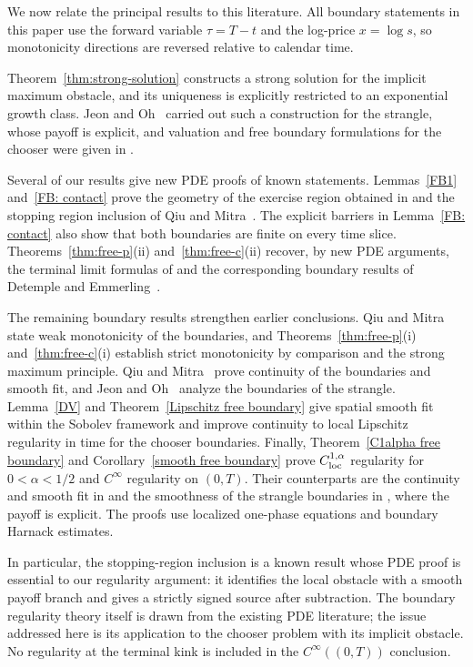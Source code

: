\documentclass[11pt, a4paper, leqno]{amsart}
\numberwithin{equation}{section}
\theoremstyle{plain}
\theoremstyle{definition}
\theoremstyle{remark}
\begin{document}
{We now relate the principal results to this literature.
All boundary statements in this paper use the forward variable
$\tau=T-t$ and the log-price $x=\log s$, so monotonicity directions are
reversed relative to calendar time.

Theorem~\ref{thm:strong-solution} constructs a strong solution for the
implicit maximum obstacle, and its uniqueness is explicitly restricted
to an exponential growth class. Jeon and Oh~\cite{JJ19} carried out such
a construction for the strangle, whose payoff is explicit, and valuation
and free boundary formulations for the chooser were given in
\cite{DETEMPLE09,Qiu2018}.

Several of our results give new PDE proofs of known statements.
Lemmas~\ref{FB1} and~\ref{FB: contact} prove the geometry of the
exercise region obtained in \cite{DETEMPLE09} and the stopping region
inclusion of Qiu and Mitra~\cite[Theorems~1 and~2]{Qiu2018}. The
explicit barriers in Lemma~\ref{FB: contact} also show that both
boundaries are finite on every time slice.
Theorems~\ref{thm:free-p}(ii) and~\ref{thm:free-c}(ii) recover, by new
PDE arguments, the terminal limit formulas of
\cite[Theorem~4]{Qiu2018} and the corresponding boundary results of
Detemple and Emmerling~\cite{DETEMPLE09}.

The remaining boundary results strengthen earlier conclusions.
Qiu and Mitra~\cite[Theorem~4]{Qiu2018} state weak monotonicity of the
boundaries, and Theorems~\ref{thm:free-p}(i) and~\ref{thm:free-c}(i)
establish strict monotonicity by comparison and the strong maximum
principle. Qiu and Mitra~\cite[Theorem~5]{Qiu2018} prove continuity of
the boundaries and smooth fit, and Jeon and Oh~\cite{JJ19} analyze the
boundaries of the strangle. Lemma~\ref{DV} and
Theorem~\ref{Lipschitz free boundary} give spatial smooth fit within the
Sobolev framework and improve continuity to local Lipschitz regularity
in time for the chooser boundaries. Finally,
Theorem~\ref{C1alpha free boundary} and
Corollary~\ref{smooth free boundary} prove $C^{1,\alpha}_{\rm loc}$
regularity for $0<\alpha<1/2$ and $C^\infty$ regularity on $(0,T)$.
Their counterparts are the continuity and smooth fit in \cite{Qiu2018}
and the smoothness of the strangle boundaries in \cite{JJ19}, where the
payoff is explicit. The proofs use localized one-phase equations and
boundary Harnack estimates.

In particular, the stopping-region inclusion is a known result whose
PDE proof is essential to our regularity argument: it identifies the local
obstacle with a smooth payoff branch and gives a strictly signed source
after subtraction. The boundary regularity theory itself is drawn from
the existing PDE literature; the issue addressed here is its application
to the chooser problem with its implicit obstacle. No regularity at the
terminal kink is included in the $C^\infty((0,T))$ conclusion.

}
\end{document}
